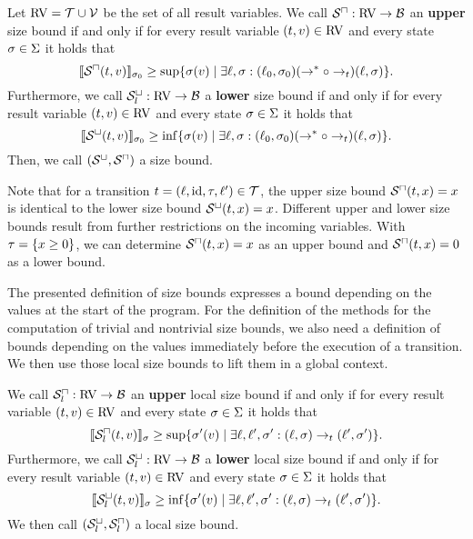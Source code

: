\begin{definition}
  Let $\text{RV} = \mathcal{T} \cup \mathcal{V}$ be the set of all result variables.
  We call ${\mathcal{S}^\sqcap}: \text{RV} \rightarrow \mathcal{B}$ an \textbf{upper} size bound if and only if for every result variable $(t, v) \in \text{RV}$ and every state $\sigma \in \Sigma$ it holds that
  \[ \llbracket {\mathcal{S}^\sqcap}(t, v) \rrbracket_{\sigma_0} \geq \sup \lbrace \sigma(v) \mid \exists \ell, \sigma: (\ell_0, \sigma_0) (\rightarrow^* \circ \rightarrow_t) (\ell, \sigma) \rbrace. \]
  Furthermore, we call ${\mathcal{S}^\sqcup_l}: \text{RV} \rightarrow \mathcal{B}$ a \textbf{lower} size bound if and only if for every result variable $(t, v) \in \text{RV}$ and every state $\sigma \in \Sigma$ it holds that
  \[ \llbracket {\mathcal{S}^\sqcup}(t, v) \rrbracket_{\sigma_0} \geq \inf \lbrace \sigma(v) \mid \exists \ell, \sigma: (\ell_0, \sigma_0) (\rightarrow^* \circ \rightarrow_t) (\ell, \sigma) \rbrace. \]
  Then, we call ${({\mathcal{S}^\sqcup}, {\mathcal{S}^\sqcap})}$ a size bound.
\end{definition}

Note that for a transition $t = (\ell,\text{id},\tau,\ell') \in \mathcal{T}$, the upper size bound ${\mathcal{S}^\sqcap}(t,x) = x$ is identical to the lower size bound ${\mathcal{S}^\sqcup}(t,x) = x$.
Different upper and lower size bounds result from further restrictions on the incoming variables.
With $\tau = \lbrace x \geq 0 \rbrace$, we can determine ${\mathcal{S}^\sqcap}(t,x) = x$ as an upper bound and ${\mathcal{S}^\sqcap}(t,x) = 0$ as a lower bound.

The presented definition of size bounds expresses a bound depending on the values at the start of the program.
For the definition of the methods for the computation of trivial and nontrivial size bounds, we also need a definition of bounds depending on the values immediately before the execution of a transition.
We then use those local size bounds to lift them in a global context.

\begin{definition}
  We call ${\mathcal{S}^\sqcap_l}: \text{RV} \rightarrow \mathcal{B}$ an \textbf{upper} local size bound if and only if for every result variable $(t, v) \in \text{RV}$ and every state $\sigma \in \Sigma$ it holds that
  \[ \llbracket {\mathcal{S}^\sqcap_l}(t, v) \rrbracket_{\sigma} \geq \sup \lbrace \sigma'(v) \mid \exists \ell, \ell', \sigma': (\ell, \sigma) \rightarrow_t (\ell', \sigma') \rbrace. \]
  Furthermore, we call ${\mathcal{S}^\sqcup_l}: \text{RV} \rightarrow \mathcal{B}$ a \textbf{lower} local size bound if and only if for every result variable $(t, v) \in \text{RV}$ and every state $\sigma \in \Sigma$ it holds that
  \[ \llbracket {\mathcal{S}^\sqcup_l}(t, v) \rrbracket_{\sigma} \geq \inf \lbrace \sigma'(v) \mid \exists \ell, \ell', \sigma': (\ell, \sigma) \rightarrow_t (\ell', \sigma') \rbrace. \]
  We then call ${({\mathcal{S}^\sqcup_l}, {\mathcal{S}^\sqcap_l})}$ a local size bound.
\end{definition}

